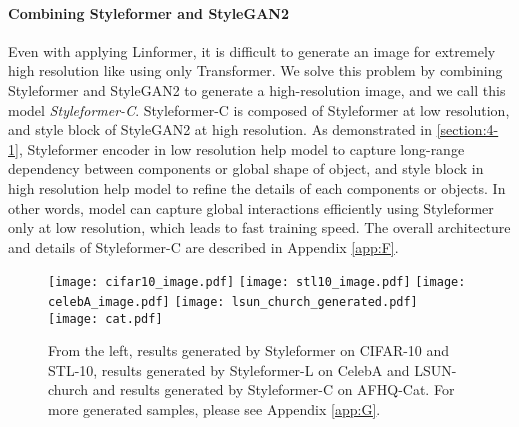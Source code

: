 \documentclass[10pt,twocolumn,letterpaper]{article}
\begin{document}
\paragraph{Combining Styleformer and StyleGAN2}
Even with applying Linformer, it is difficult to generate an image for extremely high resolution like  using only Transformer. We solve this problem by combining Styleformer and StyleGAN2 to generate a high-resolution image, and we call this model \textit{Styleformer-C}. Styleformer-C is composed of Styleformer at low resolution, and style block of StyleGAN2 at high resolution. As demonstrated in \ref{section:4-1}, Styleformer encoder in low resolution help model to capture long-range dependency between components or global shape of object, and style block in high resolution help model to refine the details of each components or objects. In other words, model can capture global interactions efficiently using Styleformer only at low resolution, which leads to fast training speed. The overall architecture and details of Styleformer-C are described in Appendix \ref{app:F}.


\begin{figure*}[t]
\begin{center}
\texttt{[image: cifar10\_image.pdf]}
\texttt{[image: stl10\_image.pdf]}
\texttt{[image: celebA\_image.pdf]}
\texttt{[image: lsun\_church\_generated.pdf]}
\texttt{[image: cat.pdf]}
\end{center}
\vspace{-5mm}
\caption{From the left, results generated by Styleformer on CIFAR-10 and STL-10, results generated by Styleformer-L on CelebA and LSUN-church and results generated by Styleformer-C on AFHQ-Cat. For more generated samples, please see Appendix \ref{app:G}.
}
\vspace{-3mm}
\label{fig:cifar}
\end{figure*}
\end{document}

